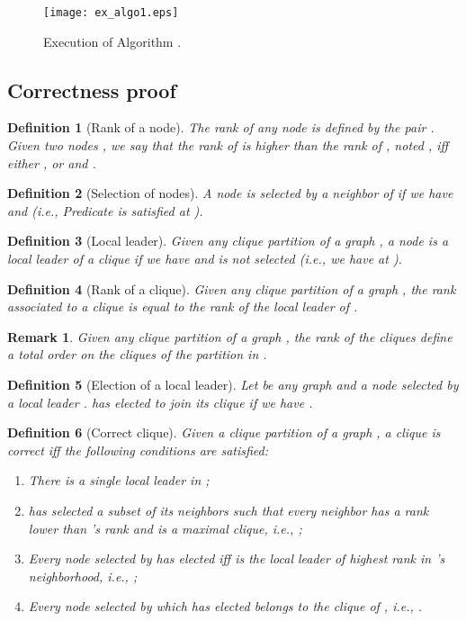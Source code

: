 \documentclass[11pt,letterpaper,onecolumn]{article}
\newtheorem{definition}{Definition}
\newtheorem{rem}{Remark}
\begin{document}
\begin{figure}[!ht]
\begin{center}
\texttt{[image: ex\_algo1.eps]}
\end{center}
\caption{Execution of Algorithm .}
\label{fig:ex_algo1}
\end{figure}

\subsection{Correctness proof}

\begin{definition}[Rank of a node]
The \emph{rank} of any node  is defined by the pair . Given two nodes , we say that the rank of  is higher than the rank of , noted , iff either , or  and .
\end{definition}

\begin{definition}[Selection of nodes]
A node  is \emph{selected} by a neighbor  of  if we have  and  (i.e., Predicate  is satisfied at ).
\end{definition}

\begin{definition}[Local leader]
\label{def:local_leader}
Given any clique partition  of a graph , a node  is a \emph{local leader} of a clique  if we have  and  is not selected (i.e., we have  at ).
\end{definition}

\begin{definition}[Rank of a clique]
Given any clique partition  of a graph , the rank associated to a clique  is equal to the rank of the local leader  of .
\end{definition}

\begin{rem}
\label{rem:total_order_clique}
Given any clique partition  of a graph , the rank of the cliques define a total order on the cliques of the partition in .
\end{rem}

\begin{definition}[Election of a local leader]
Let  be any graph and  a node selected by a local leader .  has \emph{elected}  to join its clique if we have .
\end{definition}

\begin{definition}[Correct clique]
\label{def:correct_clique}
Given a clique partition  of a graph , a clique  is \emph{correct} iff the following conditions are satisfied:
\begin{enumerate}
\item There is a single local leader  in ;
\item  has selected a subset  of its neighbors such that every neighbor  has a rank lower than 's rank and  is a maximal clique, i.e., ;
\item Every node  selected by  has elected  iff  is the local leader of highest rank in 's neighborhood, i.e., ;
\item Every node selected by  which has elected  belongs to the clique  of , i.e., .
\end{enumerate}
\end{definition}
\end{document}
